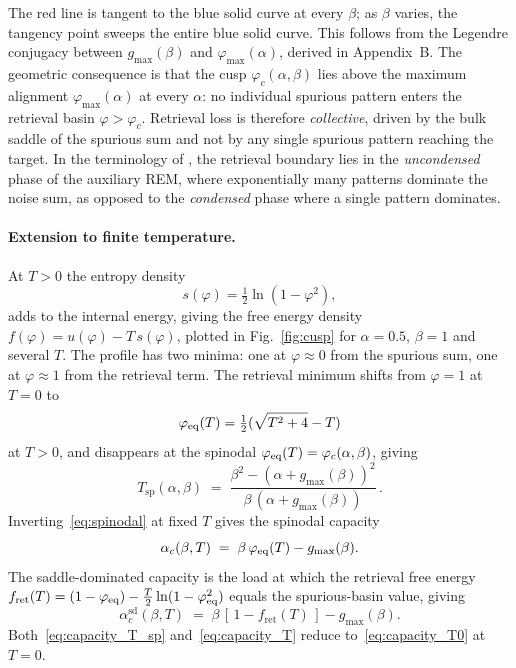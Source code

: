 \documentclass[letterpaper]{article} %
\newcommand{\Bnet}{\beta}
\newcommand{\fret}{f_{\mathrm{ret}}}
\newcommand{\gmax}{g_{\max}}
\newcommand{\ac}{\alpha_c}
\newcommand{\acSd}{\alpha_c^{\mathrm{sd}}}
\begin{document}
The red line is tangent to the blue solid curve at every $\Bnet$; as $\Bnet$
varies, the tangency point sweeps the entire blue solid curve. This follows from
the Legendre conjugacy between $g_{\max}(\Bnet)$ and $\varphi_{\max}(\alpha)$,
derived in Appendix~B. The geometric consequence is that the cusp
$\varphi_c(\alpha, \Bnet)$ lies above the maximum alignment $\varphi_{\max}(\alpha)$
at every $\alpha$: no individual spurious pattern enters the retrieval basin
$\varphi > \varphi_c$. Retrieval loss is therefore \textit{collective}, driven by
the bulk saddle of the spurious sum and not by any single spurious pattern
reaching the target. In the terminology of \citet{lucibello2024exponential}, the
retrieval boundary lies in the \textit{uncondensed} phase of the auxiliary REM,
where exponentially many patterns dominate the noise sum, as opposed to the
\textit{condensed} phase where a single pattern dominates.

\paragraph{Extension to finite temperature.}
At $T > 0$ the entropy density~\citep{icml2026theory}
\begin{equation}
    s(\varphi) = \tfrac{1}{2} \ln(1 - \varphi^2),
    \label{eq:entropy}
\end{equation}
adds to the internal energy, giving the free energy density
$f(\varphi) = u(\varphi) - T\,s(\varphi)$, plotted in Fig.~\ref{fig:cusp} for
$\alpha = 0.5$, $\Bnet = 1$ and several $T$. The profile has two minima: one at
$\varphi \approx 0$ from the spurious sum, one at $\varphi \approx 1$ from the
retrieval term. The retrieval minimum shifts from $\varphi = 1$ at $T = 0$ to
\begin{equation}
    \varphi_{\rm eq}(T) = \tfrac{1}{2}(\sqrt{T^2 + 4} - T)
    \label{eq:phi_eq}
\end{equation}
at $T > 0$, and disappears at the spinodal
$\varphi_{\rm eq}(T) = \varphi_c(\alpha, \Bnet)$, giving
\begin{equation}
    T_{\mathrm{sp}}(\alpha, \Bnet) \;=\; \frac{\Bnet^2 - (\alpha + \gmax(\Bnet))^2}
              {\Bnet\,(\alpha + \gmax(\Bnet))}\,.
    \label{eq:spinodal}
\end{equation}
Inverting~\eqref{eq:spinodal} at fixed $T$ gives the spinodal
capacity
\begin{equation}
    \ac(\Bnet, T) \;=\; \Bnet\,\varphi_{\rm eq}(T) - g_{\max}(\Bnet).
    \label{eq:capacity_T_sp}
\end{equation}
The saddle-dominated capacity is the load at which the retrieval
free energy
$\fret(T) = (1 - \varphi_{\rm eq}) - \tfrac{T}{2}\ln(1 - \varphi_{\rm eq}^2)$
equals the spurious-basin value, giving
\begin{equation}
    \acSd(\Bnet, T) \;=\; \Bnet\,[\,1 - \fret(T)\,] - g_{\max}(\Bnet).
    \label{eq:capacity_T}
\end{equation}
Both~\eqref{eq:capacity_T_sp} and~\eqref{eq:capacity_T} reduce
to~\eqref{eq:capacity_T0} at $T = 0$.
\end{document}
